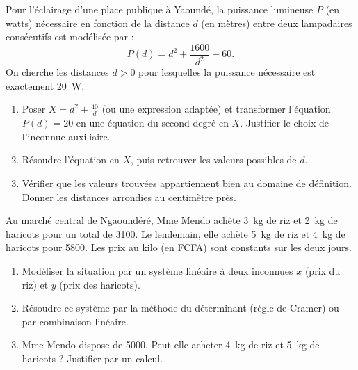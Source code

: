 \documentclass[11pt]{article}
\begin{document}
\begin{exercice}
Pour l'éclairage d'une place publique à Yaoundé, la puissance lumineuse $P$ (en watts) nécessaire en fonction de la distance $d$ (en mètres) entre deux lampadaires consécutifs est modélisée par : 
$$P(d) = d^2 + \frac{1600}{d^2} - 60.$$
On cherche les distances $d > 0$ pour lesquelles la puissance nécessaire est exactement \SI{20}{\watt}.
\begin{enumerate}
    \item Poser $X = d^2 + \frac{40}{d}$ (ou une expression adaptée) et transformer l'équation $P(d) = 20$ en une équation du second degré en $X$. Justifier le choix de l'inconnue auxiliaire.
    \item Résoudre l'équation en $X$, puis retrouver les valeurs possibles de $d$.
    \item Vérifier que les valeurs trouvées appartiennent bien au domaine de définition. Donner les distances arrondies au centimètre près.
\end{enumerate}
\end{exercice}

\begin{exercice}
Au marché central de Ngaoundéré, Mme Mendo achète \SI{3}{\kilo\gram} de riz et \SI{2}{\kilo\gram} de haricots pour un total de \SI{3100}{}. Le lendemain, elle achète \SI{5}{\kilo\gram} de riz et \SI{4}{\kilo\gram} de haricots pour \SI{5800}{}. Les prix au kilo (en FCFA) sont constants sur les deux jours.
\begin{enumerate}
    \item Modéliser la situation par un système linéaire à deux inconnues $x$ (prix du riz) et $y$ (prix des haricots).
    \item Résoudre ce système par la méthode du déterminant (règle de Cramer) ou par combinaison linéaire.
    \item Mme Mendo dispose de \SI{5000}{}. Peut-elle acheter \SI{4}{\kilo\gram} de riz et \SI{5}{\kilo\gram} de haricots ? Justifier par un calcul.
\end{enumerate}
\end{exercice}
\end{document}
